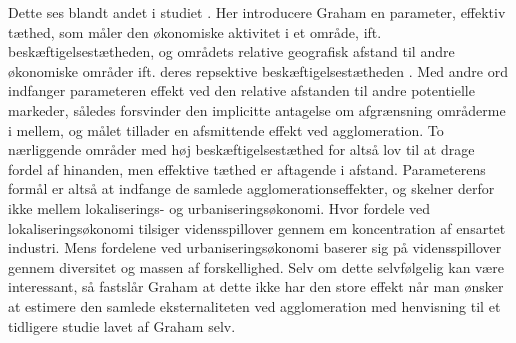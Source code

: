 \documentclass[a4paper, 12pt, titlepage]{article}
\begin{document}
Dette ses blandt andet i studiet \cite{graham2007agglomeration}. Her introducere Graham en parameter, effektiv tæthed, som måler den økonomiske aktivitet i et område, ift. beskæftigelsestætheden, og områdets relative geografisk afstand til andre økonomiske områder ift. deres repsektive beskæftigelsestætheden . Med andre ord indfanger parameteren effekt ved den relative afstanden til andre potentielle markeder, således forsvinder den implicitte antagelse om afgrænsning områderme i mellem, og målet tillader en afsmittende effekt ved agglomeration. To nærliggende områder med høj beskæftigelsestæthed for altså lov til at drage fordel af hinanden, men effektive tæthed er aftagende i afstand. Parameterens formål er altså at indfange de samlede agglomerationseffekter, og skelner derfor ikke mellem lokaliserings- og urbaniseringsøkonomi. Hvor fordele ved lokaliseringsøkonomi tilsiger vidensspillover gennem em koncentration af ensartet industri. Mens fordelene ved urbaniseringsøkonomi baserer sig på vidensspillover gennem diversitet og massen af forskellighed. Selv om dette selvfølgelig kan være interessant, så fastslår Graham at dette ikke har den store effekt når man ønsker at estimere den samlede eksternaliteten ved agglomeration med henvisning til et tidligere studie lavet af Graham selv.
\end{document}
